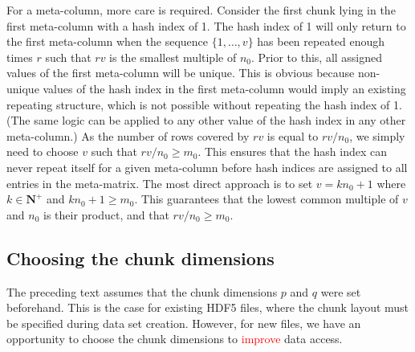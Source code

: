 \documentclass{article}
\newcommand{\revised}[1]{\textcolor{red}{#1}}
\begin{document}
For a meta-column, more care is required.
Consider the first chunk lying in the first meta-column with a hash index of 1.
The hash index of 1 will only return to the first meta-column when the sequence $\{1, \ldots, v\}$ has been repeated enough times $r$ such that $rv$ is the smallest multiple of $n_0$.
Prior to this, all assigned values of the first meta-column will be unique.
This is obvious because non-unique values of the hash index in the first meta-column would imply an existing repeating structure, which is not possible without repeating the hash index of 1.
(The same logic can be applied to any other value of the hash index in any other meta-column.)
As the number of rows covered by $rv$ is equal to $rv/n_0$, we simply need to choose $v$ such that $rv/n_0 \ge m_0$.
This ensures that the hash index can never repeat itself for a given meta-column before hash indices are assigned to all entries in the meta-matrix.
The most direct approach is to set $v = kn_0 + 1$  where $k \in \mathbf{N}^+$ and $kn_0 +1 \ge m_0$.
This guarantees that the lowest common multiple of $v$ and $n_0$ is their product, and that $rv/n_0 \ge m_0$.


\subsection{Choosing the chunk dimensions}
The preceding text assumes that the chunk dimensions $p$ and $q$ were set beforehand.
This is the case for existing HDF5 files, where the chunk layout must be specified during data set creation.
However, for new files, we have an opportunity to choose the chunk dimensions to \revised{improve} data access.
\end{document}
